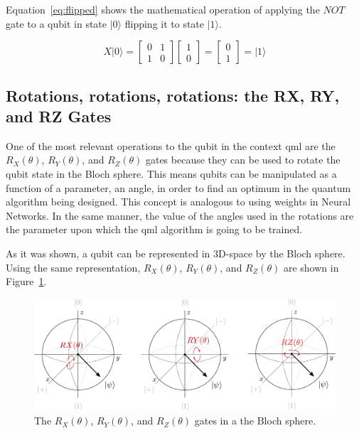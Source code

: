 Equation~\ref{eq:flipped} shows the mathematical operation of applying the $NOT$
gate to a qubit in state $\vert 0 \rangle$ flipping it to state $\vert 1 \rangle$.

\begin{linenomath}
\begin{equation}
	X\vert 0 \rangle=\begin{bmatrix} 0 & 1 \\ 1 & 0 \end{bmatrix} \begin{bmatrix} 1 \\ 0 \end{bmatrix} = \begin{bmatrix} 0 \\ 1 \end{bmatrix} = \vert 1 \rangle
\label{eq:flipped}
\end{equation}
\end{linenomath}

\subsection{Rotations, rotations, rotations: the RX, RY, and RZ Gates}
\label{sec:rot}

One of the most relevant operations to the qubit in the context \gls{qml} are 
the $R_X(\theta)$, $R_Y(\theta)$, and $R_Z(\theta)$ gates because they can be 
used to rotate the qubit state in the Bloch sphere. This means qubits can be 
manipulated as a function of a parameter, an angle, in order to find an optimum 
in the quantum algorithm being designed. This concept is analogous to using 
weights in Neural Networks. In the same manner, the value of the angles used in 
the rotations are the parameter upon which the \gls{qml} algorithm is going to 
be trained.

As it was shown, a qubit can be represented in 3D-space by the Bloch sphere. 
Using the same representation, $R_X(\theta)$, $R_Y(\theta)$, and $R_Z(\theta)$ 
are shown in Figure~\ref{fig:rots}.

\begin{figure}[!htbp]
\centering
	\includegraphics[width=1\textwidth]{figures/rotations.pdf}
\caption{The $R_X(\theta)$, $R_Y(\theta)$, and $R_Z(\theta)$ gates in a the Bloch sphere.}
\label{fig:rots}
\end{figure}

